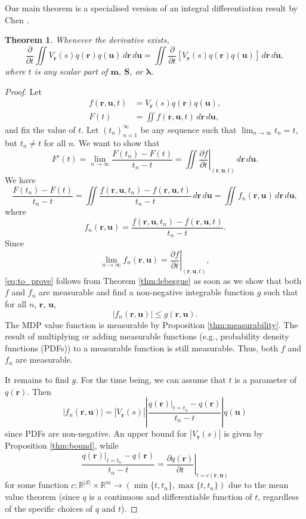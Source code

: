 \documentclass{article}
\newtheorem{theorem}{Theorem}[section]
\theoremstyle{definition}
\theoremstyle{remark}
\newcommand{\dt}{\frac{\partial}{\partial t}}
\newcommand{\f}{f(\mathbf{r}, \mathbf{u}, t)}
\newcommand{\ftn}{f(\mathbf{r}, \mathbf{u}, t_n)}
\newcommand{\fn}{f_n(\mathbf{r}, \mathbf{u})}
\newcommand{\dx}{\,d\mathbf{r}\,d\mathbf{u}}
\newcommand{\df}{\left.\frac{\partial f}{\partial t}\right|_{(\mathbf{r},
    \mathbf{u}, t)}}
\newcommand{\g}{g(\mathbf{r}, \mathbf{u})}
\begin{document}
Our main theorem is a specialised version of an integral differentiation result
by Chen \cite{lecture_notes}.
\begin{theorem}
  Whenever the derivative exists,
  \[
    \dt\iint
    V_{\mathbf{r}}(s)q(\mathbf{r})q(\mathbf{u})\dx
    = \iint
    \dt[V_{\mathbf{r}}(s)q(\mathbf{r})q(\mathbf{u})]\dx,
  \]
  where $t$ is any scalar part of $\mathbf{m}$, $\mathbf{S}$, or $\bm\lambda$.
\end{theorem}
\begin{proof}
  Let
  \begin{align*}
    \f &= V_{\mathbf{r}}(s)q(\mathbf{r})q(\mathbf{u}), \\
    F(t) &= \iint \f\dx,
  \end{align*}
  and fix the value of $t$. Let $(t_n)_{n=1}^\infty$ be any sequence such that
  $\lim_{n \to \infty} t_n = t$, but $t_n \ne t$ for all $n$. We want to show
  that
  \begin{equation} \label{eq:to_prove}
    F'(t) = \lim_{n \to \infty} \frac{F(t_n) - F(t)}{t_n - t} = \iint \df\dx.
  \end{equation}
  We have
  \[
    \frac{F(t_n) - F(t)}{t_n - t} = \iint \frac{\ftn - \f}{t_n - t}\dx =
    \iint \fn\dx,
  \]
  where
  \[
    \fn = \frac{\ftn - \f}{t_n - t}.
  \]
  Since
  \[
    \lim_{n \to \infty} \fn = \df,
  \]
  \eqref{eq:to_prove} follows from Theorem \ref{thm:lebesgue} as soon as we show
  that both $f$ and $f_n$ are measurable and find a non-negative integrable
  function $g$ such that for all $n$, $\mathbf{r}$, $\mathbf{u}$,
  \[
    |\fn| \le \g.
  \]
  The MDP value function is measurable by Proposition \ref{thm:measurability}.
  The result of multiplying or adding measurable functions (e.g., probability
  density functions (PDFs)) to a measurable function is still measurable. Thus,
  both $f$ and $f_n$ are measurable.

  It remains to find $g$. For the time being, we can assume that $t$ is a
  parameter of $q(\mathbf{r})$. Then
  \[
    |\fn| = |V_{\mathbf{r}}(s)| \left| \frac{q(\mathbf{r})|_{t =
          t_n} - q(\mathbf{r})}{t_n - t} \right| q(\mathbf{u})
  \]
  since PDFs are non-negative. An upper bound for
  $|V_{\mathbf{r}}(s)|$ is given by Proposition \ref{thm:bound}, while
  \[
    \frac{q(\mathbf{r})|_{t = t_n} - q(\mathbf{r})}{t_n - t} = \left.
      \frac{\partial q(\mathbf{r})}{\partial t} \right|_{t = c(\mathbf{r},
      \mathbf{u})}
  \]
  for some function $c : \mathbb{R}^{|\mathcal{S}|} \times \mathbb{R}^m \to
  (\min\{t, t_n\}, \max\{t, t_n\})$ due to the mean value theorem (since $q$ is
  a continuous and differentiable function of $t$, regardless of the specific
  choices of $q$ and $t$).


\end{proof}
\end{document}
